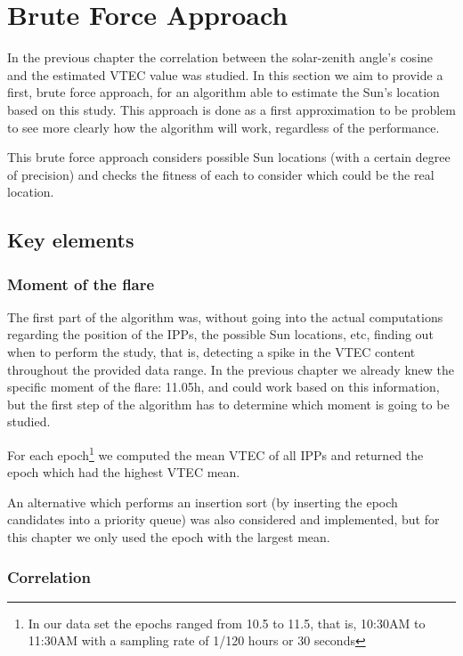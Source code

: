 \chapter{Brute Force Approach}

In the previous chapter the correlation between the solar-zenith angle's cosine and the estimated VTEC value was studied. In this section we aim to provide a first, brute force approach, for an algorithm able to estimate the Sun's location based on this study. This approach is done as a first approximation to be problem to see more clearly how the algorithm will work, regardless of the performance.

This brute force approach considers possible Sun locations (with a certain degree of precision) and checks the fitness of each to consider which could be the real location.

\section{Key elements}

\subsection{Moment of the flare}

The first part of the algorithm was, without going into the actual computations regarding the position of the IPPs, the possible Sun locations, etc, finding out when to perform the study, that is, detecting a spike in the VTEC content throughout the provided data range. 
In the previous chapter we already knew the specific moment of the flare: 11.05h, and could work based on this information, but the first step of the algorithm has to determine which moment is going to be studied.

For each epoch\footnote{In our data set the epochs ranged from 10.5 to 11.5, that is, 10:30AM to 11:30AM with a sampling rate of 1/120 hours or 30 seconds} we computed the mean VTEC of all IPPs and returned the epoch which had the highest VTEC mean.

An alternative which performs an insertion sort (by inserting the epoch candidates into a priority queue) was also considered and implemented, but for this chapter we only used the epoch with the largest mean.

\subsection{Correlation}


